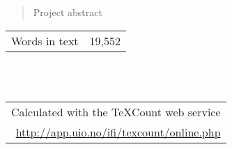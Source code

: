 \documentclass[a4paper,twoside,notitlepage,11pt]{article}
\begin{document}
%
%
%
%

\pagestyle{empty}

\cleardoublepage

%
%
%
%

\begin{abstract}
{\color{red} Project abstract}
\end{abstract}

\null
\vfill
\begin{flushright}
	\begin{tabular}{r|l}
		Words in text	& 19,552 \\
	\end{tabular}
	\ \\
	\ \\
	\begin{tabular}{cc}
		\multicolumn{2}{r}{Calculated with the TeXCount web service}\\
		\multicolumn{2}{r}{\url{http://app.uio.no/ifi/texcount/online.php}}
	\end{tabular}
\end{flushright}

\cleardoublepage

%
%
%
%

\setlength{\cftbeforesecskip}{0.6ex}
\tableofcontents
\cleardoublepage

%
%
%
%

\newpage
\pagestyle{plain}
\setcounter{page}{1}


\newpage 

\newpage 

\newpage 

\newpage 

\newpage 

\newpage 

\newpage 

\newpage 

\newpage 


%
%
%
%

\newpage
\pagestyle{biblio}





%
%
% 
%
\newpage
\pagestyle{appendix}
\appendix



%
%
%
%
\end{document}
